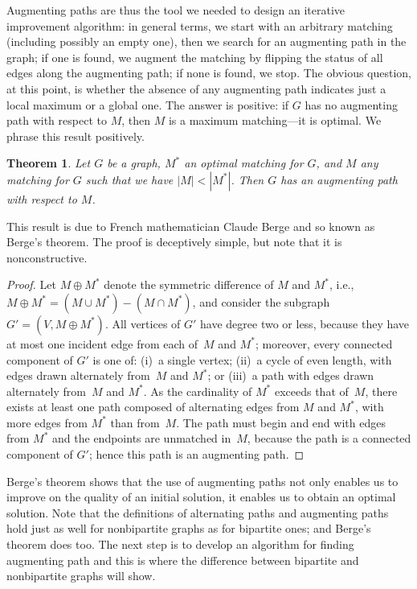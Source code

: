 \documentclass[11pt]{article}
\newtheorem{theorem}{Theorem}
\begin{document}
Augmenting paths are thus the tool we needed to design an iterative improvement
algorithm: in general terms, we start with an arbitrary matching (including
possibly an empty one), then we search for an augmenting path in the graph;
if one is found, we augment the matching by flipping the status of all edges
along the augmenting path; if none is found, we stop.  The obvious question,
at this point, is whether the absence of any augmenting path indicates just
a local maximum or a global one.   The answer is positive: if $G$ has no
augmenting path with respect to $M$, then $M$ is a maximum matching---it is
optimal.  We phrase this result positively.
\begin{theorem}
  Let $G$ be a graph, $M^{\ast}$ an optimal matching for $G$, and $M$ any
  matching for $G$ such that we have $|M|<|M^{\ast}|$.  Then $G$ has an
  augmenting path with respect to $M$.
\end{theorem}
This result is due to French mathematician Claude Berge and so known as
Berge's theorem.  The proof is deceptively simple, but note that it is
nonconstructive.
\begin{proof}
  Let $M \oplus M^{\ast}$ denote the symmetric difference of $M$ and
  $M^{\ast}$\negthinspace, i.e., $M \oplus M^{\ast} = (M \cup M^{\ast})-(M \cap
  M^{\ast})$, and consider the subgraph $G' = (V,M \oplus M^{\ast})$.  All
  vertices of $G'$ have degree two or less, because they have at most one
  incident edge from each of~$M$ and $M^{\ast}$; moreover, every connected
  component of $G'$ is one of: (i)~a single vertex; (ii)~a cycle of even
  length, with edges drawn alternately from~$M$ and $M^{\ast}$; or (iii)~a path
  with edges drawn alternately from~$M$ and $M^{\ast}$.  As the cardinality of
  $M^{\ast}$ exceeds that of~$M$, there exists at least one path composed of
  alternating edges from $M$ and $M^{\ast}$, with more edges from $M^{\ast}$
  than from~$M$.  The path must begin and end with edges from $M^{\ast}$
  and the endpoints are unmatched in~$M$, because the path is a
  connected component of $G'$; hence this path is an augmenting path.
\end{proof}
Berge's theorem shows that the use of augmenting paths not only enables us
to improve on the quality of an initial solution, it enables us to obtain an
optimal solution.  Note that the definitions of alternating paths and
augmenting paths hold just as well for nonbipartite graphs as for bipartite
ones; and Berge's theorem does too.  The next step is to develop an algorithm
for finding augmenting path and this is where the difference between
bipartite and nonbipartite graphs will show.
\end{document}
